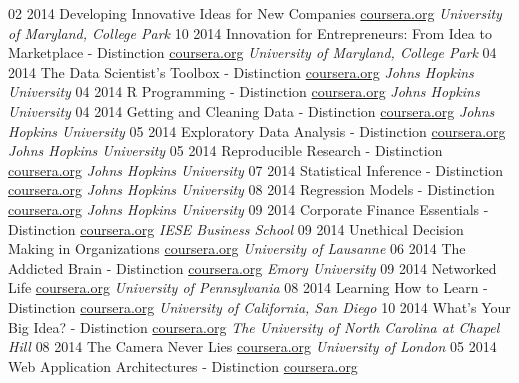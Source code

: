 \documentclass[]{friggeri-cv}
\begin{document}
\begin{entrylist}
\entry
    {02 2014}
    {Developing Innovative Ideas for New Companies}
    {\href{http://coursera.org}{coursera.org}}
    {\emph{University of Maryland, College Park}}
\entry
    {10 2014}
    {Innovation for Entrepreneurs: From Idea to Marketplace - Distinction}
    {\href{http://coursera.org}{coursera.org}}
    {\emph{University of Maryland, College Park}}
 \entry
    {04 2014}
    {The Data Scientist’s Toolbox - Distinction}
    {\href{http://coursera.org}{coursera.org}}
    {\emph{Johns Hopkins University}}
 \entry
    {04 2014}
    {R Programming - Distinction}
    {\href{http://coursera.org}{coursera.org}}
    {\emph{Johns Hopkins University}}
\entry
    {04 2014}
    {Getting and Cleaning Data - Distinction}
    {\href{http://coursera.org}{coursera.org}}
    {\emph{Johns Hopkins University}}
\entry
    {05 2014}
    {Exploratory Data Analysis - Distinction}
    {\href{http://coursera.org}{coursera.org}}
    {\emph{Johns Hopkins University}}
\entry
    {05 2014}
    {Reproducible Research - Distinction}
    {\href{http://coursera.org}{coursera.org}}
    {\emph{Johns Hopkins University}}
\entry
    {07 2014}
    {Statistical Inference - Distinction}
    {\href{http://coursera.org}{coursera.org}}
    {\emph{Johns Hopkins University}}
\entry
    {08 2014}
    {Regression Models - Distinction}
    {\href{http://coursera.org}{coursera.org}}
    {\emph{Johns Hopkins University}}
\entry
    {09 2014}
    {Corporate Finance Essentials - Distinction}
    {\href{http://coursera.org}{coursera.org}}
    {\emph{IESE Business School}}
\entry
    {09 2014}
    {Unethical Decision Making in Organizations}
    {\href{http://coursera.org}{coursera.org}}
    {\emph{University of Lausanne}}
\entry
    {06 2014}
    {The Addicted Brain - Distinction}
    {\href{http://coursera.org}{coursera.org}}
    {\emph{Emory University}}
\entry
    {09 2014}
    {Networked Life}
    {\href{http://coursera.org}{coursera.org}}
    {\emph{University of Pennsylvania}}
\entry
    {08 2014}
    {Learning How to Learn - Distinction}
    {\href{http://coursera.org}{coursera.org}}
    {\emph{University of California, San Diego}}
\entry
    {10 2014}
    {What's Your Big Idea? - Distinction}
    {\href{http://coursera.org}{coursera.org}}
    {\emph{The University of North Carolina at Chapel Hill}}
\entry
    {08 2014}
    {The Camera Never Lies}
    {\href{http://coursera.org}{coursera.org}}
    {\emph{University of London}}
 \entry
    {05 2014}
    {Web Application Architectures - Distinction}
    {\href{http://coursera.org}{coursera.org}}

\end{entrylist}
\end{document}
